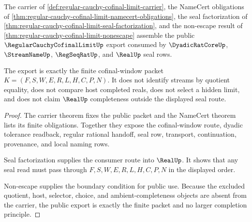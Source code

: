 \begin{theorem}
\label{thm:regular-cauchy-cofinal-limit-public-export}
The carrier of \autoref{def:regular-cauchy-cofinal-limit-carrier}, the NameCert obligations of \autoref{thm:regular-cauchy-cofinal-limit-namecert-obligations}, the seal factorization of \autoref{thm:regular-cauchy-cofinal-limit-seal-factorization}, and the non-escape result of \autoref{thm:regular-cauchy-cofinal-limit-nonescape} assemble the public $\RegularCauchyCofinalLimitUp$ export consumed by $\DyadicRatCoreUp$, $\StreamNameUp$, $\RegSeqRatUp$, and $\RealUp$ seal rows.

The export is exactly the finite cofinal-window packet $K=(F,S,W,E,R,L,H,C,P,N)$. It does not identify streams by quotient equality, does not compare host completed reals, does not select a hidden limit, and does not claim $\RealUp$ completeness outside the displayed seal route.
\end{theorem}
\begin{proof}
The carrier theorem fixes the public packet and the NameCert theorem lists its finite obligations. Together they expose the cofinal-window route, dyadic tolerance readback, regular rational handoff, seal row, transport, continuation, provenance, and local naming rows.

Seal factorization supplies the consumer route into $\RealUp$. It shows that any seal read must pass through $F,S,W,E,R,L,H,C,P,N$ in the displayed order.

Non-escape supplies the boundary condition for public use. Because the excluded quotient, host, selector, choice, and ambient-completeness objects are absent from the carrier, the public export is exactly the finite packet and no larger completion principle.
\end{proof}


